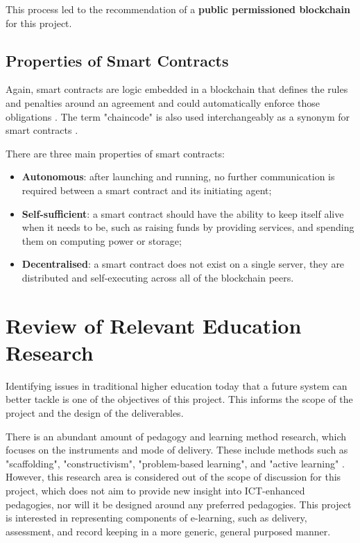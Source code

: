 This process led to the recommendation of a \textbf{public permissioned blockchain} for this project.

\subsection{Properties of Smart Contracts}
Again, smart contracts are logic embedded in a blockchain that defines the rules and penalties around an agreement and 
could automatically enforce those obligations \citep{gulhane2017ibm}. The term "chaincode" is also used interchangeably 
as a synonym for smart contracts \citep[p.6]{valenta2017comparison}.

There are three main properties of smart contracts:

\begin{itemize}
    \item \textbf{Autonomous}: after launching and running, no further communication is required between a smart contract 
    and its initiating agent;
    \item \textbf{Self-sufficient}: a smart contract should have the ability to keep itself alive when it needs to be, 
    such as raising funds by providing services, and spending them on computing power or storage;
    \item \textbf{Decentralised}: a smart contract does not exist on a single server, they are distributed and self-executing 
    across all of the blockchain peers.\\ 
    \citet[p.16]{swan2015blockchain} 
\end{itemize}

\section{Review of Relevant Education Research}

Identifying issues in traditional higher education today that a future system can better 
tackle is one of the objectives of this project. This informs the scope of the 
project and the design of the deliverables.

There is an abundant amount of pedagogy and learning method research, which focuses on the 
instruments and mode of delivery. These include methods such as "scaffolding", "constructivism", 
"problem-based learning", and "active learning" \citep{ali2005effective}. However, this 
research area is considered out of the scope of discussion for this project, which does not 
aim to provide new insight into ICT-enhanced pedagogies, nor will it be designed around any 
preferred pedagogies. This project is interested in representing components of e-learning, 
such as delivery, assessment, and record keeping in a more generic, general purposed manner.

